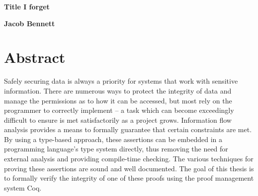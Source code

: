 \documentclass[12pt]{report}
\def\fCenter{{\mbox{\Large$\rightarrow$}}}
\begin{document}
\begin{titlepage}
\begin{center}

\begin{spacing}{1.5}
    \vspace*{\fill}
\end{spacing}

\begin{spacing}{2.5}
    \textbf{\Large Title  I forget}\\[0.5cm]
    \vspace*{\fill}
\end{spacing}

\begin{spacing}{1.15}
    \textbf{\large Jacob Bennett}
    \date{}
\end{spacing}

\end{center}
\end{titlepage}





\setcounter{secnumdepth}{2}
\setcounter{tocdepth}{2}
\tableofcontents


\begin{coqdoccode}
\coqdocemptyline
\end{coqdoccode}
\chapter{Abstract}



 Safely securing data is always a priority for systems that work with
 sensitive information. There are numerous ways to protect the
 integrity of data and manage the permissions as to how it can be
 accessed, but most rely on the programmer to correctly implement
 – a task which can become exceedingly difficult to ensure is met
 satisfactorily as a project grows. Information flow analysis
 provides a means to formally guarantee that certain constraints are
 met. By using a type-based approach, these assertions can be
 embedded in a programming language's type system directly, thus
 removing the need for external analysis and providing compile-time
 checking. The various techniques for proving these assertions are
 sound and well documented. The goal of this thesis is to formally
 verify the integrity of one of these proofs using the proof
 management system Coq. 
\end{document}
